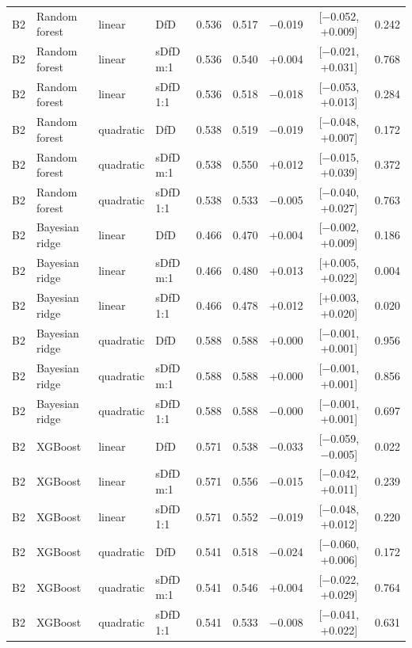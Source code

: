 \begin{longtable}{llllccccc}
B2 & Random forest & linear & DfD & 0.536 & 0.517 & $-$0.019 & [$-$0.052, +0.009] & 0.242 \\
B2 & Random forest & linear & sDfD m:1 & 0.536 & 0.540 & +0.004 & [$-$0.021, +0.031] & 0.768 \\
B2 & Random forest & linear & sDfD 1:1 & 0.536 & 0.518 & $-$0.018 & [$-$0.053, +0.013] & 0.284 \\
B2 & Random forest & quadratic & DfD & 0.538 & 0.519 & $-$0.019 & [$-$0.048, +0.007] & 0.172 \\
B2 & Random forest & quadratic & sDfD m:1 & 0.538 & 0.550 & +0.012 & [$-$0.015, +0.039] & 0.372 \\
B2 & Random forest & quadratic & sDfD 1:1 & 0.538 & 0.533 & $-$0.005 & [$-$0.040, +0.027] & 0.763 \\
B2 & Bayesian ridge & linear & DfD & 0.466 & 0.470 & +0.004 & [$-$0.002, +0.009] & 0.186 \\
B2 & Bayesian ridge & linear & sDfD m:1 & 0.466 & 0.480 & +0.013 & [+0.005, +0.022] & 0.004 \\
B2 & Bayesian ridge & linear & sDfD 1:1 & 0.466 & 0.478 & +0.012 & [+0.003, +0.020] & 0.020 \\
B2 & Bayesian ridge & quadratic & DfD & 0.588 & 0.588 & +0.000 & [$-$0.001, +0.001] & 0.956 \\
B2 & Bayesian ridge & quadratic & sDfD m:1 & 0.588 & 0.588 & +0.000 & [$-$0.001, +0.001] & 0.856 \\
B2 & Bayesian ridge & quadratic & sDfD 1:1 & 0.588 & 0.588 & $-$0.000 & [$-$0.001, +0.001] & 0.697 \\
B2 & XGBoost & linear & DfD & 0.571 & 0.538 & $-$0.033 & [$-$0.059, $-$0.005] & 0.022 \\
B2 & XGBoost & linear & sDfD m:1 & 0.571 & 0.556 & $-$0.015 & [$-$0.042, +0.011] & 0.239 \\
B2 & XGBoost & linear & sDfD 1:1 & 0.571 & 0.552 & $-$0.019 & [$-$0.048, +0.012] & 0.220 \\
B2 & XGBoost & quadratic & DfD & 0.541 & 0.518 & $-$0.024 & [$-$0.060, +0.006] & 0.172 \\
B2 & XGBoost & quadratic & sDfD m:1 & 0.541 & 0.546 & +0.004 & [$-$0.022, +0.029] & 0.764 \\
B2 & XGBoost & quadratic & sDfD 1:1 & 0.541 & 0.533 & $-$0.008 & [$-$0.041, +0.022] & 0.631 \\
\bottomrule
\end{longtable}